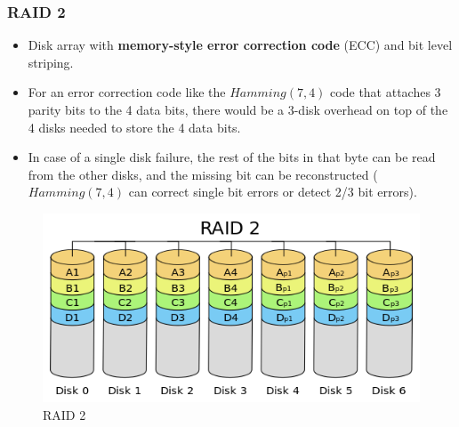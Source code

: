 \documentclass{article}
\theoremstyle{plain}
\theoremstyle{definition}
\begin{document}
\subsubsection{RAID 2}
\begin{itemize}
    \item Disk array with \textbf{memory-style error correction code} (ECC) and bit level striping. 
    
    \item For an error correction code like the $Hamming(7,4)$ code that attaches 3 parity bits to the 4 data bits, there would be a 3-disk overhead on top of the 4 disks needed to store the 4 data bits.
    
    \item In case of a single disk failure, the rest of the bits in that byte can be read from the other disks, and the missing bit can be reconstructed ($Hamming(7,4)$ can correct single bit errors or detect 2/3 bit errors). 
    
\end{itemize}

\begin{figure}[!h]
    \centering
    \includegraphics[scale=0.4]{raid2.png}
    \caption{RAID 2}
    \label{fig:my_label_2}
\end{figure}
\end{document}
